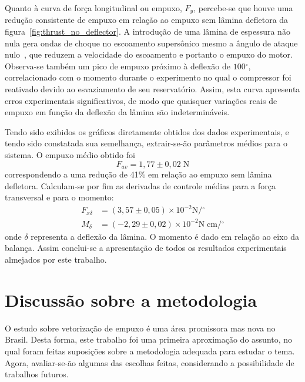 Quanto à curva de força longitudinal ou empuxo, \(F_y\), percebe-se que houve uma redução consistente de empuxo em relação ao empuxo sem lâmina defletora da figura~\ref{fig:thrust_no_deflector}. A introdução de uma lâmina de espessura não nula gera ondas de choque no escoamento supersônico mesmo a ângulo de ataque nulo~\cite{anderson}, que reduzem a velocidade do escoamento e portanto o empuxo do motor. Observa-se também um pico de empuxo próximo à deflexão de \(100\mathrm{^\circ}\), correlacionado com o momento durante o experimento no qual o compressor foi reativado devido ao esvaziamento de seu reservatório. Assim, esta curva apresenta erros experimentais significativos, de modo que quaisquer variações reais de empuxo em função da deflexão da lâmina são indetermináveis.

Tendo sido exibidos os gráficos diretamente obtidos dos dados experimentais, e tendo sido constatada sua semelhança, extrair-se-ão parâmetros médios para o sistema. O empuxo médio obtido foi 
\begin{equation}
    F_{av} = 1,77 \pm 0,02\;\mathrm{N}
\end{equation}
correspondendo a uma redução de 41\% em relação ao empuxo sem lâmina defletora. Calculam-se por fim as derivadas de controle médias para a força transversal e para o momento:
\begin{align}
    F_{x\delta} &= (3,57 \pm 0,05)\times10^{-2} \mathrm{N} / \mathrm{^\circ} \\
    M_\delta &= (-2,29 \pm 0,02)\times10^{-2} \mathrm{N}\;\mathrm{cm} / \mathrm{^\circ}
\end{align}
onde \(\delta \) representa a deflexão da lâmina. O momento é dado em relação ao eixo da balança. Assim conclui-se a apresentação de todos os resultados experimentais almejados por este trabalho.

\section{Discussão sobre a metodologia}\label{sec:discussion}

O estudo sobre vetorização de empuxo é uma área promissora mas nova no Brasil. Desta forma, este trabalho foi uma primeira aproximação do assunto, no qual foram feitas suposições sobre a metodologia adequada para estudar o tema. Agora, avaliar-se-ão algumas das escolhas feitas, considerando a possibilidade de trabalhos futuros.

